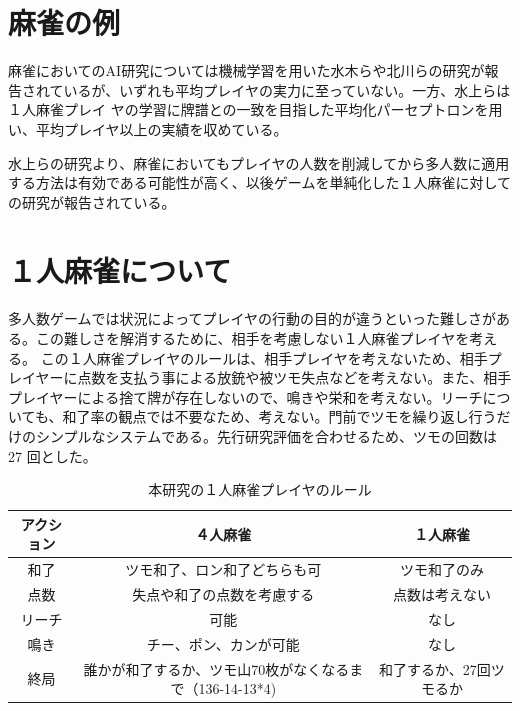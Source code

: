 \section{麻雀の例}

麻雀においてのAI研究については機械学習を用いた水木ら\cite{miki}や北川ら\cite{kitakawa}の研究が報告されているが、いずれも平均プレイヤの実力に至っていない。一方、水上ら\cite{bakuuti}は１人麻雀プレイ ヤの学習に牌譜との一致を目指した平均化パーセプトロンを用い、平均プレイヤ以上の実績を収めている。

水上らの研究より、麻雀においてもプレイヤの人数を削減してから多人数に適用する方法は有効である可能性が高く、以後ゲームを単純化した１人麻雀に対しての研究が報告されている。

\section{１人麻雀について}
多人数ゲームでは状況によってプレイヤの行動の目的が違うといった難しさがある。この難しさを解消するために、相手を考慮しない１人麻雀プレイヤを考える。
この１人麻雀プレイヤのルールは、相手プレイヤを考えないため、相手プレイヤーに点数を支払う事による放銃や被ツモ失点などを考えない。また、相手プレイヤーによる捨て牌が存在しないので、鳴きや栄和を考えない。リーチについても、和了率の観点では不要なため、考えない。門前でツモを繰り返し行うだけのシンプルなシステムである。先行研究\cite{bakuuti}評価を合わせるため、ツモの回数は 27 回とした。

\begin{table}[htbp]
  \caption{本研究の１人麻雀プレイヤのルール}
  \label{tb:bakuuti_score}
  \begin{center}
  \begin{tabular}{c|c|c}
    \hline
    アクション	 & ４人麻雀 & １人麻雀 \\\hline\hline
    和了 	& ツモ和了、ロン和了どちらも可 & ツモ和了のみ\\\hline
    点数 & 失点や和了の点数を考慮する & 点数は考えない\\\hline
    リーチ & 可能 & なし\\\hline
    鳴き & チー、ポン、カンが可能 & なし\\\hline
    終局 & 誰かが和了するか、ツモ山70枚がなくなるまで（136-14-13*4) & 和了するか、27回ツモるか\\\hline
  \end{tabular}\end{center}
\end{table}

